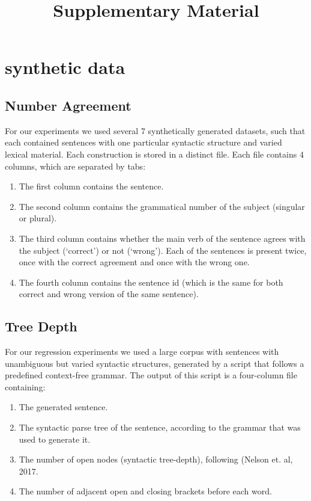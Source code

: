 \documentclass{article}
\title{Supplementary Material}
\date{}
\author{}
\begin{document}
\maketitle

\section{synthetic data}
\subsection{Number Agreement}

For our experiments we used several 7 synthetically generated datasets, such that each contained sentences with one particular syntactic structure and varied lexical material.
Each construction is stored in a distinct file.
Each file contains 4 columns, which are separated by tabs:

\begin{enumerate}
    \item The first column contains the sentence.
    \item The second column contains the grammatical number of the subject (singular or plural).
    \item The third column contains whether the main verb of the sentence agrees with the subject (`correct') or not (`wrong'). Each of the sentences is present twice, once with the correct agreement and once with the wrong one.
    \item The fourth column contains the sentence id (which is the same for both correct and wrong version of the same sentence).
\end{enumerate}

\subsection{Tree Depth}
For our regression experiments we used a large corpus with sentences with unambiguous but varied syntactic structures, generated by a script that follows a predefined context-free grammar.
The output of this script is a four-column file containing:\begin{enumerate}
    \item The generated sentence.
    \item The syntactic parse tree of the sentence, according to the grammar that was used to generate it.
    \item The number of open nodes (syntactic tree-depth), following (Nelson et. al, 2017.
    \item The number of adjacent open and closing brackets before each word.
\end{enumerate}
\end{document}
